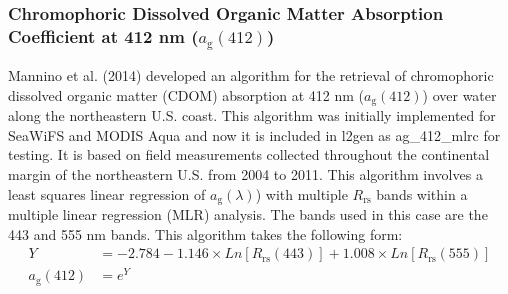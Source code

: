 \documentclass[remotesensing,article,submit,moreauthors,pdftex,10pt,a4paper]{Definitions/mdpi}
\begin{document}

    


\subsubsection{Chromophoric Dissolved Organic Matter Absorption Coefficient at 412 nm ($a_\text{g}(412)$)}

Mannino et al. (2014) \cite{Mannino2014} developed an algorithm for the retrieval of chromophoric dissolved organic matter (CDOM) absorption at 412 nm ($a_\text{g}(412)$) over water along the northeastern U.S. coast. This algorithm was initially implemented for SeaWiFS and MODIS Aqua and now it is included in l2gen as ag\_412\_mlrc for testing. It is based on field measurements collected throughout the continental margin of the northeastern U.S. from 2004 to 2011. This algorithm involves a least squares linear regression of $a_\text{g}(\lambda)$) with multiple $R_\text{rs}$ bands within a multiple linear regression (MLR) analysis. The bands used in this case are the 443 and 555 nm bands. This algorithm takes the following form: 
\begin{equation}
\begin{split}
  Y &= -2.784 -1.146\times Ln[R_\text{rs}(443)] + 1.008\times Ln[R_\text{rs}(555)] \\
  a_\text{g}(412) &= e^Y
\end{split}
\end{equation}

\end{document}

